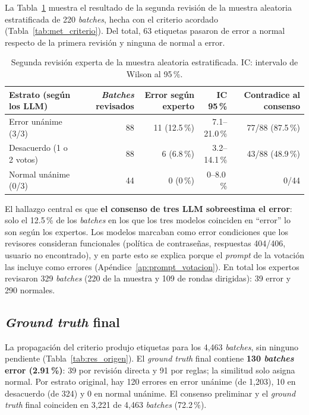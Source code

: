 La Tabla~\ref{tab:res_expertos} muestra el resultado de la segunda revisión de la muestra aleatoria estratificada de 220 \textit{batches}, hecha con el criterio acordado (Tabla~\ref{tab:met_criterio}). Del total, 63 etiquetas pasaron de error a normal respecto de la primera revisión y ninguna de normal a error.

\begin{table}[H]
\centering
\caption{Segunda revisión experta de la muestra aleatoria estratificada. IC: intervalo de Wilson al 95\,\%.}
\label{tab:res_expertos}
\small
\begin{tabular}{@{}lrrrr@{}}
\toprule
\textbf{Estrato (según los LLM)} & \textbf{\textit{Batches} revisados} & \textbf{Error según experto} & \textbf{IC 95\,\%} & \textbf{Contradice al consenso} \\
\midrule
Error unánime (3/3) & 88 & 11 (12.5\,\%) & 7.1--21.0\,\% & 77/88 (87.5\,\%) \\
Desacuerdo (1 o 2 votos) & 88 & 6 (6.8\,\%) & 3.2--14.1\,\% & 43/88 (48.9\,\%) \\
Normal unánime (0/3) & 44 & 0 (0\,\%) & 0--8.0\,\% & 0/44 \\
\bottomrule
\end{tabular}
\normalsize
\end{table}

El hallazgo central es que \textbf{el consenso de tres LLM sobreestima el error}: solo el 12.5\,\% de los \textit{batches} en los que los tres modelos coinciden en ``error'' lo son según los expertos. Los modelos marcaban como error condiciones que los revisores consideran funcionales (política de contraseñas, respuestas 404/406, usuario no encontrado), y en parte esto se explica porque el \textit{prompt} de la votación las incluye como errores (Apéndice~\ref{ap:prompt_votacion}). En total los expertos revisaron 329 \textit{batches} (220 de la muestra y 109 de rondas dirigidas): 39 error y 290 normales.

\subsection{\textit{Ground truth} final}

La propagación del criterio produjo etiquetas para los 4{,}463 \textit{batches}, sin ninguno pendiente (Tabla~\ref{tab:res_origen}). El \textit{ground truth} final contiene \textbf{130 \textit{batches} error (2.91\,\%)}: 39 por revisión directa y 91 por reglas; la similitud solo asigna normal. Por estrato original, hay 120 errores en error unánime (de 1{,}203), 10 en desacuerdo (de 324) y 0 en normal unánime. El consenso preliminar y el \textit{ground truth} final coinciden en 3{,}221 de 4{,}463 \textit{batches} (72.2\,\%).

